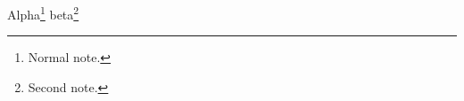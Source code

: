 \documentclass{article}
\begin{document}
Alpha\footnote{Normal note.} beta\footnote{Second note.}
\end{document}
